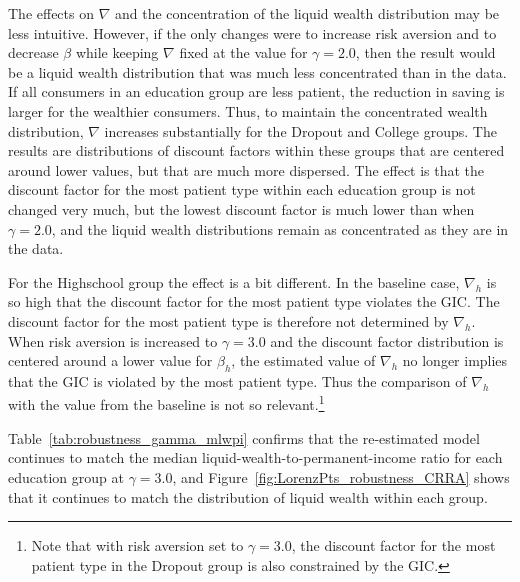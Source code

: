 \documentclass[\latexroot/\projectname]{subfiles}
\begin{document}
The effects on $\nabla$ and the concentration of the liquid wealth distribution may be less intuitive.
However, if the only changes were to increase risk aversion and to decrease $\beta$ while keeping $\nabla$ fixed at the value for $\gamma=2.0$, then the result would be a liquid wealth distribution that was much less concentrated than in the data.
If all consumers in an education group are less patient, the reduction in saving is larger for the wealthier consumers.
Thus, to maintain the concentrated wealth distribution, $\nabla$ increases substantially for the Dropout and College groups.
The results are distributions of discount factors within these groups that are centered around lower values, but that are much more dispersed.
The effect is that the discount factor for the most patient type within each education group is not changed very much, but the lowest discount factor is much lower than when $\gamma=2.0$, and the liquid wealth distributions remain as concentrated as they are in the data.

For the Highschool group the effect is a bit different.
In the baseline case, $\nabla_h$ is so high that the discount factor for the most patient type violates the GIC.
The discount factor for the most patient type is therefore not determined by $\nabla_h$.
When risk aversion is increased to $\gamma=3.0$ and the discount factor distribution is centered around a lower value for $\beta_h$, the estimated value of $\nabla_h$ no longer implies that the GIC is violated by the most patient type.
Thus the comparison of $\nabla_h$ with the value from the baseline is not so relevant.\footnote{Note that with risk aversion set to $\gamma=3.0$, the discount factor for the most patient type in the Dropout group is also constrained by the GIC.}

Table~\ref{tab:robustness_gamma_mlwpi} confirms that the re-estimated model continues to match the median liquid-wealth-to-permanent-income ratio for each education group at $\gamma=3.0$, and Figure~\ref{fig:LorenzPts_robustness_CRRA} shows that it continues to match the distribution of liquid wealth within each group.
\end{document}
